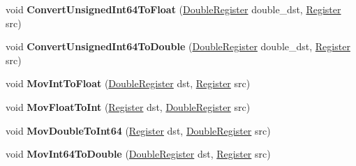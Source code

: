 \begin{DoxyCompactItemize}
\item 
\mbox{\label{classv8_1_1internal_1_1TurboAssembler_a9bccf07be9ca3bf8de47c9e1f3ba6efb}} 
void {\bfseries Convert\+Unsigned\+Int64\+To\+Float} (\mbox{\hyperlink{classv8_1_1internal_1_1DoubleRegister}{Double\+Register}} double\+\_\+dst, \mbox{\hyperlink{classv8_1_1internal_1_1Register}{Register}} src)
\item 
\mbox{\label{classv8_1_1internal_1_1TurboAssembler_a1604f4f5513ecf087480b0d97120d5dc}} 
void {\bfseries Convert\+Unsigned\+Int64\+To\+Double} (\mbox{\hyperlink{classv8_1_1internal_1_1DoubleRegister}{Double\+Register}} double\+\_\+dst, \mbox{\hyperlink{classv8_1_1internal_1_1Register}{Register}} src)
\item 
\mbox{\label{classv8_1_1internal_1_1TurboAssembler_a1ce4ffc9b42b0cde8bfeb88dca2db6e4}} 
void {\bfseries Mov\+Int\+To\+Float} (\mbox{\hyperlink{classv8_1_1internal_1_1DoubleRegister}{Double\+Register}} dst, \mbox{\hyperlink{classv8_1_1internal_1_1Register}{Register}} src)
\item 
\mbox{\label{classv8_1_1internal_1_1TurboAssembler_a182324f120fb8a0db31959258ae22bb9}} 
void {\bfseries Mov\+Float\+To\+Int} (\mbox{\hyperlink{classv8_1_1internal_1_1Register}{Register}} dst, \mbox{\hyperlink{classv8_1_1internal_1_1DoubleRegister}{Double\+Register}} src)
\item 
\mbox{\label{classv8_1_1internal_1_1TurboAssembler_a68854042ff566f7b5d8413cfdc9e68b9}} 
void {\bfseries Mov\+Double\+To\+Int64} (\mbox{\hyperlink{classv8_1_1internal_1_1Register}{Register}} dst, \mbox{\hyperlink{classv8_1_1internal_1_1DoubleRegister}{Double\+Register}} src)
\item 
\mbox{\label{classv8_1_1internal_1_1TurboAssembler_a52f3b3d37d4028375843f38870fb52e6}} 
void {\bfseries Mov\+Int64\+To\+Double} (\mbox{\hyperlink{classv8_1_1internal_1_1DoubleRegister}{Double\+Register}} dst, \mbox{\hyperlink{classv8_1_1internal_1_1Register}{Register}} src)
\item 
\mbox{\label{classv8_1_1internal_1_1TurboAssembler_a9080e52368c24560a53d7c7dc956ec6a}} 

\end{DoxyCompactItemize}
